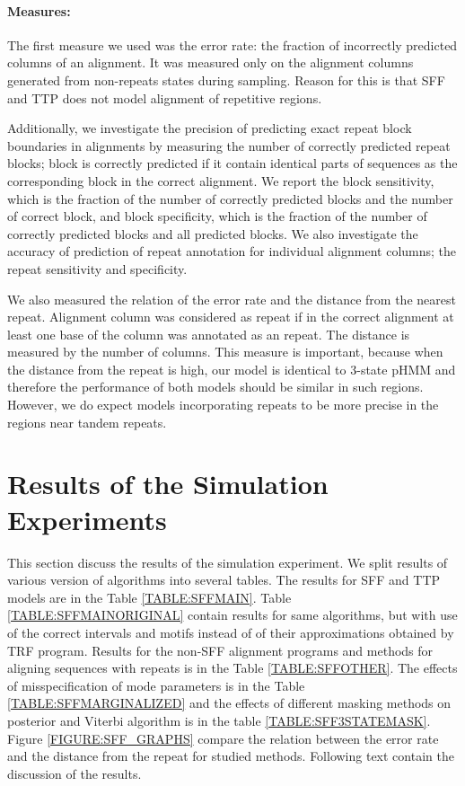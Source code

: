 \paragraph{Measures:} The first measure we used was the error rate: the
fraction of incorrectly predicted columns of an alignment. It was measured only
on the alignment columns generated from non-repeats states during sampling.
Reason for this is that SFF and TTP does not model alignment of repetitive
regions.

Additionally, we investigate the precision of predicting exact repeat block
boundaries in alignments by measuring the number of correctly predicted repeat
blocks; block is correctly predicted if it contain identical parts of sequences
as the corresponding block in the correct alignment. We report the block
sensitivity, which is the fraction of the number of correctly predicted blocks
and the number of correct block, and block specificity, which is the fraction
of the number of correctly predicted blocks and all predicted blocks. We also
investigate the accuracy of prediction of repeat annotation for individual
alignment columns; the repeat sensitivity and specificity.

We also measured the relation of the error rate and the distance
from the nearest repeat. Alignment column was considered as repeat if in the
correct alignment at least one base of the column was annotated as an repeat.
The distance is measured by the number of columns. This measure is important,
because when the distance from the repeat is high, our model is identical to
3-state pHMM and therefore the performance of both models should be similar in
such regions. However, we do expect models incorporating repeats to be more
precise in the regions near tandem repeats.

\section{Results of the Simulation Experiments}\label{SECTION:REPSIMRESULTS}

This section discuss the results of the simulation experiment. We split results
of various version of algorithms into several tables. The results for SFF and
TTP models are in the Table \ref{TABLE:SFFMAIN}. Table
\ref{TABLE:SFFMAINORIGINAL} contain results for same algorithms, but with use
of the correct intervals and motifs instead of of their approximations obtained
by TRF program. Results for the non-SFF alignment programs and methods for
aligning sequences with repeats is in the Table \ref{TABLE:SFFOTHER}. The
effects of misspecification of mode parameters is in the Table
\ref{TABLE:SFFMARGINALIZED} and the effects of different masking methods on
posterior and Viterbi algorithm is in the table \ref{TABLE:SFF3STATEMASK}.
Figure \ref{FIGURE:SFF_GRAPHS} compare the relation between the error rate and
the distance from the repeat for studied methods. Following text contain the
discussion of the results.

